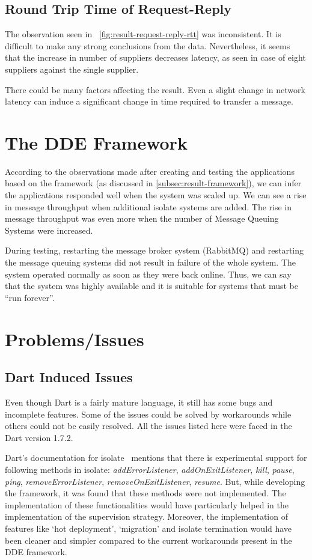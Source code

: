 \subsection{Round Trip Time of Request-Reply}
  The observation seen in ~\autoref{fig:result-request-reply-rtt} was inconsistent. It is difficult to make any strong conclusions from the data. Nevertheless, it seems that the increase in number of suppliers decreases latency, as seen in case of eight suppliers against the single supplier.

  There could be many factors affecting the result. Even a slight change in network latency can induce a significant change in time required to transfer a message.

\section{The DDE Framework}
  According to the observations made after creating and testing the applications based on the framework (as discussed in \autoref{subsec:result-framework}), we can infer the applications responded well when the system was scaled up. We can see a rise in message throughput when additional isolate systems are added. The rise in message throughput was even more when the number of Message Queuing Systems were increased.

  During testing, restarting the message broker system (RabbitMQ) and restarting the message queuing systems did not result in failure of the whole system. The system operated normally as soon as they were back online. Thus, we can say that the system was highly available and it is suitable for systems that must be “run forever”.

\section{Problems/Issues}

\subsection{Dart Induced Issues}
\label{subsec:result-dartIssues}
  Even though Dart is a fairly mature language, it still has some bugs and incomplete features. Some of the issues could be solved by workarounds while others could not be easily resolved. All the issues listed here were faced in the Dart version 1.7.2.

  Dart's documentation for isolate~\cite{dartApiIsolate} mentions that there is experimental support for following methods in isolate: \emph{addErrorListener},  \emph{addOnExitListener}, \emph{kill}, \emph{pause}, \emph{ping}, \emph{removeErrorListener}, \emph{removeOnExitListener}, \emph{resume}. But, while developing the framework, it was found that these methods were not implemented. The implementation of these functionalities would have particularly helped in the implementation of the supervision strategy. Moreover, the implementation of features like ‘hot deployment’, ‘migration’ and isolate termination would have been cleaner and simpler compared to the current workarounds present in the DDE framework.

